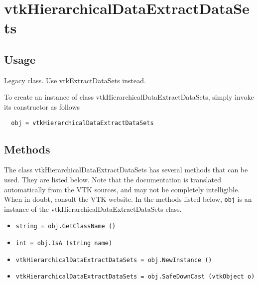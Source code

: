 \section{vtkHierarchicalDataExtractDataSets}

\subsection{Usage}

 Legacy class. Use vtkExtractDataSets instead.


To create an instance of class vtkHierarchicalDataExtractDataSets, simply
invoke its constructor as follows
\begin{verbatim}
  obj = vtkHierarchicalDataExtractDataSets
\end{verbatim}
\subsection{Methods}

The class vtkHierarchicalDataExtractDataSets has several methods that can be used.
  They are listed below.
Note that the documentation is translated automatically from the VTK sources,
and may not be completely intelligible.  When in doubt, consult the VTK website.
In the methods listed below, \verb|obj| is an instance of the vtkHierarchicalDataExtractDataSets class.
\begin{itemize}
\item  \verb|string = obj.GetClassName ()|

\item  \verb|int = obj.IsA (string name)|

\item  \verb|vtkHierarchicalDataExtractDataSets = obj.NewInstance ()|

\item  \verb|vtkHierarchicalDataExtractDataSets = obj.SafeDownCast (vtkObject o)|

\end{itemize}
